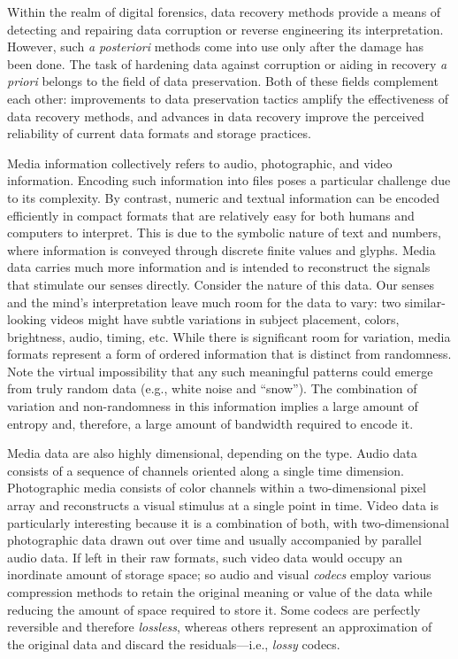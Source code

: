 Within the realm of digital forensics, data recovery methods provide a means of detecting and repairing data corruption or reverse engineering its interpretation. However, such \emph{a posteriori} methods come into use only after the damage has been done. The task of hardening data against corruption or aiding in recovery \emph{a priori} belongs to the field of data preservation. Both of these fields complement each other: improvements to data preservation tactics amplify the effectiveness of data recovery methods, and advances in data recovery improve the perceived reliability of current data formats and storage practices. 

Media information collectively refers to audio, photographic, and video information. Encoding such information into files poses a particular challenge due to its complexity. By contrast, numeric and textual information can be encoded efficiently in compact formats that are relatively easy for both humans and computers to interpret. This is due to the symbolic nature of text and numbers, where information is conveyed through discrete finite values and glyphs. Media data carries much more information and is intended to reconstruct the signals that stimulate our senses directly. Consider the nature of this data. Our senses and the mind's interpretation leave much room for the data to vary: two similar-looking videos might have subtle variations in subject placement, colors, brightness, audio, timing, etc. While there is significant room for variation, media formats represent a form of ordered information that is distinct from randomness. Note the virtual impossibility that any such meaningful patterns could emerge from truly random data (e.g., white noise and ``snow''). The combination of variation and non-randomness in this information implies a large amount of entropy and, therefore, a large amount of bandwidth required to encode it.

Media data are also highly dimensional, depending on the type. Audio data consists of a sequence of channels oriented along a single time dimension. Photographic media consists of color channels within a two-dimensional pixel array and reconstructs a visual stimulus at a single point in time. Video data is particularly interesting because it is a combination of both, with two-dimensional photographic data drawn out over time and usually accompanied by parallel audio data. If left in their raw formats, such video data would occupy an inordinate amount of storage space; so audio and visual \emph{codecs} employ various compression methods to retain the original meaning or value of the data while reducing the amount of space required to store it. Some codecs are perfectly reversible and therefore \emph{lossless}, whereas others represent an approximation of the original data and discard the residuals---i.e., \emph{lossy} codecs.

